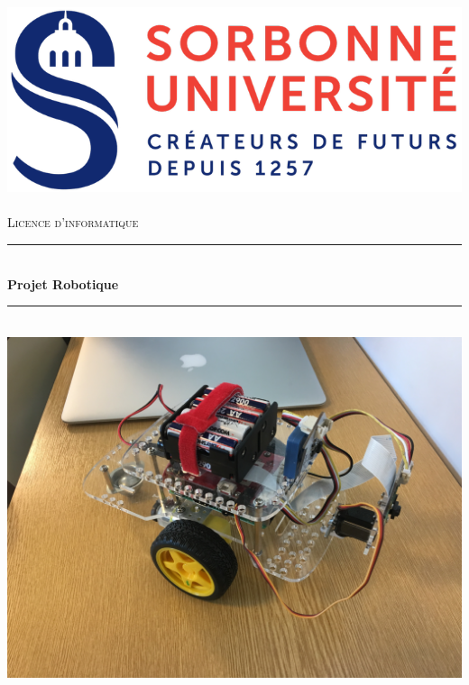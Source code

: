 \documentclass[12pt]{article}
\newcommand{\HRule}{\rule{\linewidth}{0.5mm}}
\begin{document}
\begin{titlepage}
  \begin{sffamily}
  \begin{center}

    \includegraphics[scale=0.2]{Images/Sorbonne_U.png}~\\[1cm] %


    \textsc{\Large Licence d'informatique}\\[1.5cm]

    \HRule \\[1cm]
    { \huge \bfseries Projet Robotique\\[0.4cm] }

    \HRule \\[1cm]
    \includegraphics[scale=0.1]{Images/IMG_8579.JPG}
    \\[2cm]


\end{center}
\end{sffamily}
\end{titlepage}
\end{document}
